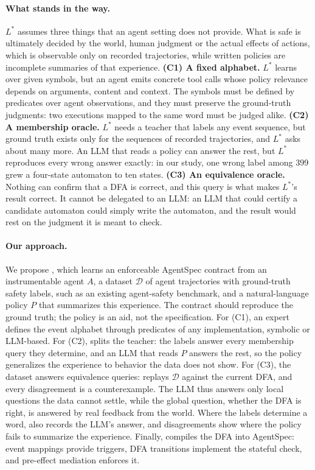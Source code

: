 \paragraph{What stands in the way.}
$L^*$ assumes three things that an agent setting does not provide. What is safe is ultimately decided by the world, human judgment or the actual effects of actions, which is observable only on recorded trajectories, while written policies are incomplete summaries of that experience.
\textbf{(C1) A fixed alphabet.} $L^*$ learns over given symbols, but an agent emits concrete tool calls whose policy relevance depends on arguments, content and context. The symbols must be defined by predicates over agent observations, and they must preserve the ground-truth judgments: two executions mapped to the same word must be judged alike.
\textbf{(C2) A membership oracle.} $L^*$ needs a teacher that labels any event sequence, but ground truth exists only for the sequences of recorded trajectories, and $L^*$ asks about many more. An LLM that reads a policy can answer the rest, but $L^*$ reproduces every wrong answer exactly: in our study, one wrong label among 399 grew a four-state automaton to ten states.
\textbf{(C3) An equivalence oracle.} Nothing can confirm that a DFA is correct, and this query is what makes $L^*$'s result correct. It cannot be delegated to an LLM: an LLM that could certify a candidate automaton could simply write the automaton, and the result would rest on the judgment it is meant to check.

\paragraph{Our approach.}
We propose \system{}, which learns an enforceable AgentSpec contract from an instrumentable agent $A$, a dataset $\mathcal{D}$ of agent trajectories with ground-truth safety labels, such as an existing agent-safety benchmark, and a natural-language policy $P$ that summarizes this experience. The contract should reproduce the ground truth; the policy is an aid, not the specification. For (C1), an expert defines the event alphabet through predicates of any implementation, symbolic or LLM-based. For (C2), \system splits the teacher: the labels answer every membership query they determine, and an LLM that reads $P$ answers the rest, so the policy generalizes the experience to behavior the data does not show. For (C3), the dataset answers equivalence queries: \system replays $\mathcal{D}$ against the current DFA, and every disagreement is a counterexample. The LLM thus answers only local questions the data cannot settle, while the global question, whether the DFA is right, is answered by real feedback from the world. Where the labels determine a word, \system also records the LLM's answer, and disagreements show where the policy fails to summarize the experience. Finally, \system compiles the DFA into AgentSpec: event mappings provide triggers, DFA transitions implement the stateful check, and pre-effect mediation enforces it.

